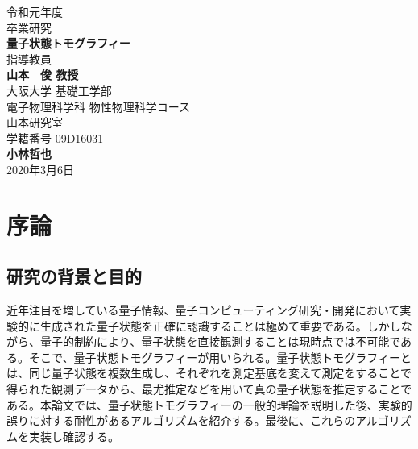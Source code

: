 \documentclass[11pt,a4j,notitlepage]{jreport}
\def\HUGE{\fontsize{32pt}{36pt}\selectfont} %
\begin{document}
	\begin{titlepage}
		\begin{center}\begin{LARGE}
			\vspace{1em}
			{令和元年度}\\
			\vspace{1.5em}
			{卒業研究}\vspace{3em}\\
			\textbf{\HUGE 量子状態トモグラフィー}\\
			\vspace{4em}
			{\LARGE 指導教員}\\
			\vspace{0.8em}
			{\Huge\bf 山本　俊 教授}\\
			\vspace{0.2\vsize}
			{大阪大学 基礎工学部\\ 電子物理科学科 物性物理科学コース\\ 山本研究室\\学籍番号 09D16031}\\
			\vspace{0.8em}
			{\Huge\bf 小林哲也}\\
			\vspace{3em}
			{\Large 2020年3月6日}
		\end{LARGE}\end{center}
	\end{titlepage}


	\setcounter{tocdepth}{2}
	\tableofcontents

	\clearpage

	\listoffigures

	\clearpage


	\chapter{序論}
	\section{研究の背景と目的}
	近年注目を増している量子情報、量子コンピューティング研究・開発において実験的に生成された量子状態を正確に認識することは極めて重要である。しかしながら、量子的制約により、量子状態を直接観測することは現時点では不可能である。そこで、量子状態トモグラフィーが用いられる。量子状態トモグラフィーとは、同じ量子状態を複数生成し、それぞれを測定基底を変えて測定をすることで得られた観測データから、最尤推定などを用いて真の量子状態を推定することである。本論文では、量子状態トモグラフィーの一般的理論を説明した後、実験的誤りに対する耐性があるアルゴリズムを紹介する。最後に、これらのアルゴリズムを実装し確認する。
\end{document}
